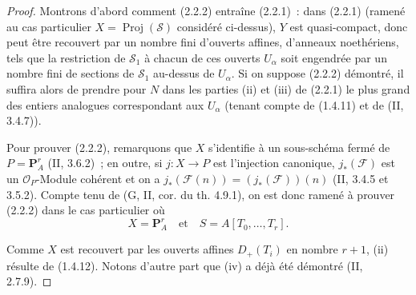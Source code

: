 \begin{proof}
Montrons d'abord comment (2.2.2) entraîne (2.2.1)~: dans (2.2.1)
(ramené au cas particulier $X=\operatorname{Proj}(\mathcal S)$ considéré
ci-dessus), $Y$ est quasi-compact, donc peut être recouvert par un nombre
fini d'ouverts affines, d'anneaux noethériens, tels que la restriction de
$\mathcal S_1$ à chacun de ces ouverts $U_\alpha$ soit engendrée par un
nombre fini de sections de $\mathcal S_1$ au-dessus de $U_\alpha$. Si on
suppose (2.2.2) démontré, il suffira alors de prendre pour $N$ dans les
parties (ii) et (iii) de (2.2.1) le plus grand des entiers analogues
correspondant aux $U_\alpha$ (tenant compte de (1.4.11) et de
(II, 3.4.7)).

Pour prouver (2.2.2), remarquons que $X$ s'identifie à un sous-schéma
fermé de $P=\mathbf P_A^r$ (II, 3.6.2)~; en outre, si $j:X\to P$ est
l'injection canonique, $j_*(\mathcal F)$ est un
$\mathcal O_P$-Module cohérent et on a
$j_*(\mathcal F(n))=(j_*(\mathcal F))(n)$ (II, 3.4.5 et 3.5.2).
Compte tenu de (G, II, cor. du th. 4.9.1), on est donc ramené à prouver
(2.2.2) dans le cas particulier où
\[
X=\mathbf P_A^r\quad\text{et}\quad S=A[T_0,\ldots,T_r].
\]

Comme $X$ est recouvert par les ouverts affines $D_+(T_i)$ en nombre
$r+1$, (ii) résulte de (1.4.12). Notons d'autre part que (iv) a déjà été
démontré (II, 2.7.9).


\end{proof}
